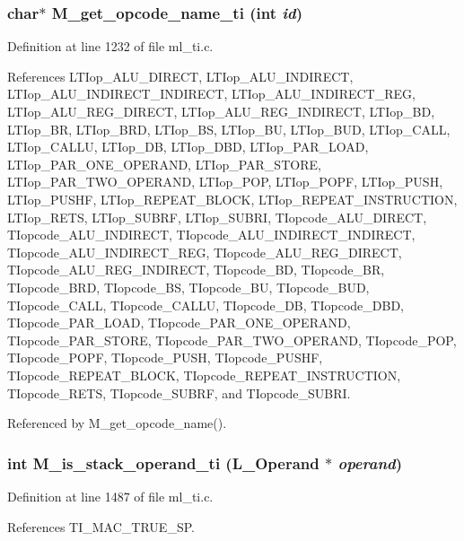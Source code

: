 \subsubsection{\setlength{\rightskip}{0pt plus 5cm}char$\ast$ M\_\-get\_\-opcode\_\-name\_\-ti (int {\em id})}\label{m__ti_8h_4732884a2388381c9aa84c4b45adfd26}




Definition at line 1232 of file ml\_\-ti.c.

References LTIop\_\-ALU\_\-DIRECT, LTIop\_\-ALU\_\-INDIRECT, LTIop\_\-ALU\_\-INDIRECT\_\-INDIRECT, LTIop\_\-ALU\_\-INDIRECT\_\-REG, LTIop\_\-ALU\_\-REG\_\-DIRECT, LTIop\_\-ALU\_\-REG\_\-INDIRECT, LTIop\_\-BD, LTIop\_\-BR, LTIop\_\-BRD, LTIop\_\-BS, LTIop\_\-BU, LTIop\_\-BUD, LTIop\_\-CALL, LTIop\_\-CALLU, LTIop\_\-DB, LTIop\_\-DBD, LTIop\_\-PAR\_\-LOAD, LTIop\_\-PAR\_\-ONE\_\-OPERAND, LTIop\_\-PAR\_\-STORE, LTIop\_\-PAR\_\-TWO\_\-OPERAND, LTIop\_\-POP, LTIop\_\-POPF, LTIop\_\-PUSH, LTIop\_\-PUSHF, LTIop\_\-REPEAT\_\-BLOCK, LTIop\_\-REPEAT\_\-INSTRUCTION, LTIop\_\-RETS, LTIop\_\-SUBRF, LTIop\_\-SUBRI, TIopcode\_\-ALU\_\-DIRECT, TIopcode\_\-ALU\_\-INDIRECT, TIopcode\_\-ALU\_\-INDIRECT\_\-INDIRECT, TIopcode\_\-ALU\_\-INDIRECT\_\-REG, TIopcode\_\-ALU\_\-REG\_\-DIRECT, TIopcode\_\-ALU\_\-REG\_\-INDIRECT, TIopcode\_\-BD, TIopcode\_\-BR, TIopcode\_\-BRD, TIopcode\_\-BS, TIopcode\_\-BU, TIopcode\_\-BUD, TIopcode\_\-CALL, TIopcode\_\-CALLU, TIopcode\_\-DB, TIopcode\_\-DBD, TIopcode\_\-PAR\_\-LOAD, TIopcode\_\-PAR\_\-ONE\_\-OPERAND, TIopcode\_\-PAR\_\-STORE, TIopcode\_\-PAR\_\-TWO\_\-OPERAND, TIopcode\_\-POP, TIopcode\_\-POPF, TIopcode\_\-PUSH, TIopcode\_\-PUSHF, TIopcode\_\-REPEAT\_\-BLOCK, TIopcode\_\-REPEAT\_\-INSTRUCTION, TIopcode\_\-RETS, TIopcode\_\-SUBRF, and TIopcode\_\-SUBRI.

Referenced by M\_\-get\_\-opcode\_\-name().
\subsubsection{\setlength{\rightskip}{0pt plus 5cm}int M\_\-is\_\-stack\_\-operand\_\-ti (L\_\-Operand $\ast$ {\em operand})}\label{m__ti_8h_39785d8ee8a076ab945940addf0a3084}




Definition at line 1487 of file ml\_\-ti.c.

References TI\_\-MAC\_\-TRUE\_\-SP.

